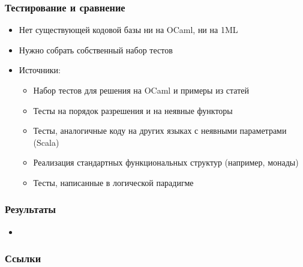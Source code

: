 \documentclass{beamer}
\begin{document}
\begin{frame}\frametitle{Тестирование и сравнение}
\begin{itemize}
  \item Нет существующей кодовой базы ни на OCaml, ни на 1ML
  \item Нужно собрать собственный набор тестов
  \item Источники:
  \begin{itemize}
    \item Набор тестов для решения на OCaml и примеры из статей
    \item Тесты на порядок разрешения и на неявные функторы
    \item Тесты, аналогичные коду на других языках с неявными параметрами (Scala)
    \item Реализация стандартных функциональных структур (например, монады)
    \item Тесты, написанные в логической парадигме
  \end{itemize}
\end{itemize}
\end{frame}

\begin{frame}\frametitle{Результаты}
\begin{itemize}
    \item
\end{itemize}
\end{frame}

\appendix

\begin{frame}[allowframebreaks]\frametitle{Ссылки}
\printbibliography
\end{frame}
\end{document}
